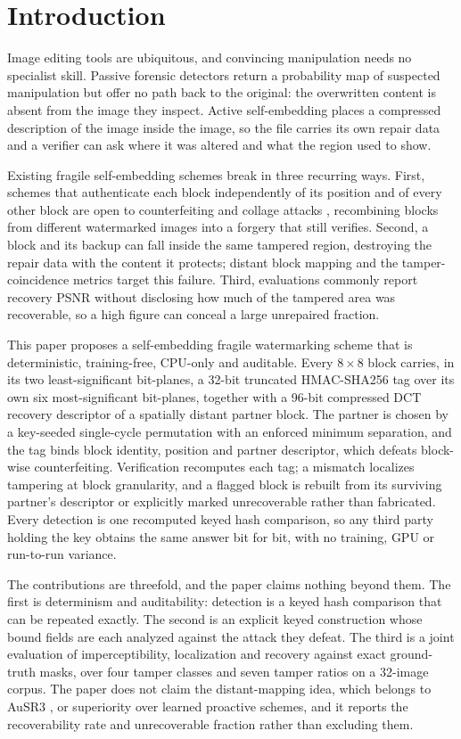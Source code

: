 \section{Introduction}

Image editing tools are ubiquitous, and convincing manipulation needs no specialist skill. Passive forensic detectors \cite{zhou2018learning,wu2019mantranet} return a probability map of suspected manipulation but offer no path back to the original: the overwritten content is absent from the image they inspect. Active self-embedding \cite{fridrich1999selfembedding,fridrich1999selfcorrecting} places a compressed description of the image inside the image, so the file carries its own repair data and a verifier can ask where it was altered and what the region used to show.

Existing fragile self-embedding schemes break in three recurring ways. First, schemes that authenticate each block independently of its position and of every other block are open to counterfeiting and collage attacks \cite{holliman2000counterfeiting,fridrich2002security}, recombining blocks from different watermarked images into a forgery that still verifies. Second, a block and its backup can fall inside the same tampered region, destroying the repair data with the content it protects; distant block mapping \cite{ausr3} and the tamper-coincidence metrics \cite{tcbr_tcbd} target this failure. Third, evaluations commonly report recovery PSNR without disclosing how much of the tampered area was recoverable, so a high figure can conceal a large unrepaired fraction.

This paper proposes a self-embedding fragile watermarking scheme that is deterministic, training-free, CPU-only and auditable. Every $8{\times}8$ block carries, in its two least-significant bit-planes, a 32-bit truncated HMAC-SHA256 tag over its own six most-significant bit-planes, together with a 96-bit compressed DCT recovery descriptor of a spatially distant partner block. The partner is chosen by a key-seeded single-cycle permutation with an enforced minimum separation, and the tag binds block identity, position and partner descriptor, which defeats block-wise counterfeiting. Verification recomputes each tag; a mismatch localizes tampering at block granularity, and a flagged block is rebuilt from its surviving partner's descriptor or explicitly marked unrecoverable rather than fabricated. Every detection is one recomputed keyed hash comparison, so any third party holding the key obtains the same answer bit for bit, with no training, GPU or run-to-run variance.

The contributions are threefold, and the paper claims nothing beyond them. The first is determinism and auditability: detection is a keyed hash comparison that can be repeated exactly. The second is an explicit keyed construction whose bound fields are each analyzed against the attack they defeat. The third is a joint evaluation of imperceptibility, localization and recovery against exact ground-truth masks, over four tamper classes and seven tamper ratios on a 32-image corpus. The paper does not claim the distant-mapping idea, which belongs to AuSR3 \cite{ausr3}, or superiority over learned proactive schemes, and it reports the recoverability rate and unrecoverable fraction rather than excluding them.

